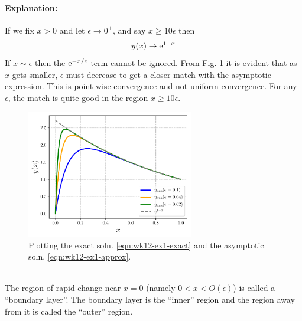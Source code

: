 \paragraph{Explanation:} If we fix $x>0$ and let $\epsilon \rightarrow 0^+$, and say $x\geq 10 \epsilon$ then 
\begin{gather}\label{eqn:wk12-ex1-approx}
	y(x) \rightarrow \mathrm{e}^{1-x}
\end{gather}
If $x\sim \epsilon$ then the $\mathrm{e}^{-x/\epsilon}$ term cannot be ignored. From Fig. \ref{fig:strogatz-wk12} it is evident that as $x$ gets smaller, $\epsilon$ must decrease to get a closer match with the asymptotic expression. This is point-wise convergence and not uniform convergence. For any $\epsilon$, the match is quite good in the region $x \geq 10\epsilon$.
\begin{figure}[!h]
	\centering
	\includegraphics[width=0.65\textwidth]{./plots/pdf/strogatz-wk12.pdf}
	\caption{Plotting the exact soln. \ref{eqn:wk12-ex1-exact} and the asymptotic soln. \ref{eqn:wk12-ex1-approx}.}
	\label{fig:strogatz-wk12}
\end{figure} \\
The region of rapid change near $x=0$ (namely $0<x<O(\epsilon)$) is called a ``boundary layer''. The boundary layer is the ``inner'' region and the region away from it is called the ``outer'' region. 

